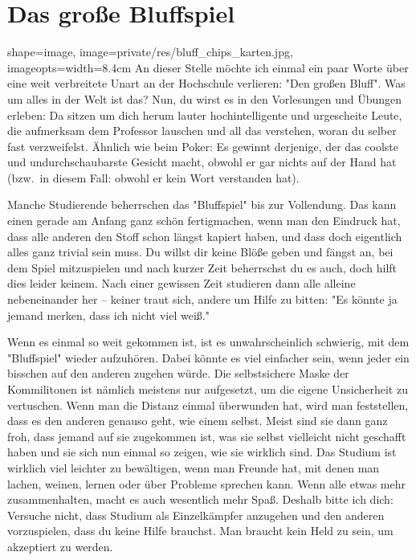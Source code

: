 \section{Das große Bluffspiel}
\begin{pullquote}{shape=image, image=private/res/bluff_chips_karten.jpg, imageopts={width=8.4cm}}
An dieser Stelle möchte ich einmal ein paar Worte über eine weit verbreitete Unart an der Hochschule verlieren: "Den großen Bluff".
Was um alles in der Welt ist das?
Nun, du wirst es in den Vorlesungen und Übungen erleben: Da sitzen um dich herum lauter hochintelligente und urgescheite Leute, die aufmerksam dem Professor lauschen und all das verstehen, woran du selber fast verzweifelst.
Ähnlich wie beim Poker: Es gewinnt derjenige, der das coolste und undurchschaubarste Gesicht macht, obwohl er gar nichts auf der Hand hat (bzw.\ in diesem Fall: obwohl er kein Wort verstanden hat).\pullquotenl

Manche Studierende beherrschen das "Bluffspiel" bis zur Vollendung.
Das kann einen gerade am Anfang ganz schön fertigmachen, wenn man den Eindruck hat, dass alle anderen den Stoff schon längst kapiert haben, und dass doch eigentlich alles ganz trivial sein muss.
Du willst dir keine Blöße geben und fängst an, bei dem Spiel mitzuspielen und nach kurzer Zeit beherrschst du es auch, doch hilft dies leider keinem.
Nach einer gewissen Zeit studieren dann alle alleine nebeneinander her -- keiner traut sich, andere um Hilfe zu bitten: "Es könnte ja jemand merken, dass ich nicht viel weiß."%

Wenn es einmal so weit gekommen ist, ist es unwahrscheinlich schwierig, mit dem "Bluffspiel" wieder aufzuhören.
Dabei könnte es viel einfacher sein, wenn jeder ein bisschen auf den anderen zugehen würde.
Die selbstsichere Maske der Kommilitonen ist nämlich meistens nur aufgesetzt, um die eigene Unsicherheit zu vertuschen.
Wenn man die Distanz einmal überwunden hat, wird man feststellen, dass es den anderen genauso geht, wie einem selbst.
Meist sind sie dann ganz froh, dass jemand auf sie zugekommen ist, was sie selbst vielleicht nicht geschafft haben und sie sich nun einmal so zeigen, wie sie wirklich sind.
Das Studium ist wirklich viel leichter zu bewältigen, wenn man Freunde hat, mit denen man lachen, weinen, lernen oder über Probleme sprechen kann.
Wenn alle etwas mehr zusammenhalten, macht es auch wesentlich mehr Spaß.
Deshalb bitte ich dich: Versuche nicht, dass Studium als Einzelkämpfer anzugehen und den anderen vorzuspielen, dass du keine Hilfe brauchst.
Man braucht kein Held zu sein, um akzeptiert zu werden.\pullquotenl
\pullquotenl

\pullquotenl
\end{pullquote}
